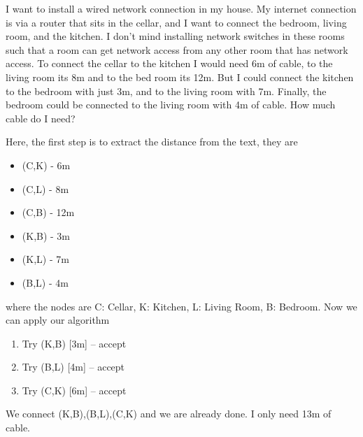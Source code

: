 




 I want to install a wired network connection in my house. My internet connection is via a router that sits in the cellar, and I want to connect the bedroom, living room, and the kitchen. I don't mind installing network switches in these rooms such that a room can get network access from any other room that has network access. To connect the cellar to the kitchen I would need 6m of cable, to the living room its 8m and to the bed room its 12m. But I could connect the kitchen to the bedroom with just 3m, and to the living room with 7m. Finally, the bedroom could be connected to the living room with 4m of cable. How much cable do I need?


\solution
Here, the first step is to extract the distance from the text, they are 
\begin{itemize}
\item (C,K) - 6m
\item (C,L) - 8m
\item (C,B) - 12m
\item (K,B) - 3m
\item (K,L) - 7m
\item (B,L) - 4m
\end{itemize}
where the nodes are C: Cellar, K: Kitchen, L: Living Room, B: Bedroom. Now we can apply our algorithm
\begin{enumerate}[label=\arabic*.]
\item Try (K,B) [3m] -- accept
\item Try (B,L) [4m] -- accept
\item Try (C,K) [6m] -- accept
\end{enumerate}
We connect (K,B),(B,L),(C,K) and we are already done. I only need 13m of cable.

